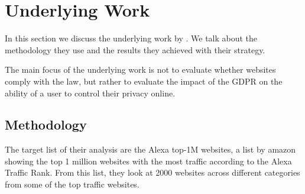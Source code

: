 \section{Underlying Work}
\label{sec:underlying}

In this section we discuss the underlying work by . We talk about the methodology they use and the
results they achieved with their strategy.

The main focus of the underlying work is not to evaluate whether websites comply with the law, but rather to evaluate
the impact of the GDPR on the ability of a user to control their privacy online.

\subsection{Methodology}
\label{subsec:methodology}

The target list of their analysis are the Alexa top-1M websites, a list by amazon showing the top 1 million websites with
the most traffic according to the Alexa Traffic Rank. From this list, they look at 2000 websites across different
categories from some of the top traffic websites.

